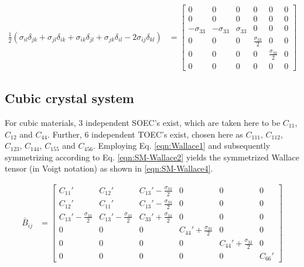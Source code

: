 \documentclass[showpacs,aps,floatfix,prb,reprint,superscriptaddress,onecolumn]{revtex4-1}
\begin{document}
\begin{enumerate}
\begin{equation}
\label{eqn:SM-Wallace3}
  \begin{aligned}
        \frac{1}{2} \left(\sigma_{il} \delta_{jk} + \sigma_{jl} \delta_{ik} + \sigma_{ik} \delta_{jl} + \sigma_{jk} \delta_{il} - 2\sigma_{ij} \delta_{kl} \right)&=\begin{bmatrix} 0 & 0 & 0 & 0 & 0 & 0 \\ 0 & 0 & 0 & 0 & 0 & 0 \\ -\sigma_{33} & -\sigma_{33} & \sigma_{33} & 0 & 0 & 0 \\ 0 & 0 & 0 & \frac{\sigma_{33}}{2} & 0 & 0 \\ 0 & 0 & 0 & 0 & \frac{\sigma_{33}}{2} & 0 \\ 0 & 0 & 0 & 0 & 0 & 0 \end{bmatrix}
       \end{aligned}
\end{equation} 

\subsection{Cubic crystal system}
For cubic materials, 3 independent SOEC's exist, which are taken here to be $C_{11}$, $C_{12}$ and $C_{44}$. Further, 6 independent TOEC's exist, chosen here as $C_{111}$, $C_{112}$, $C_{123}$, $C_{144}$, $C_{155}$ and $C_{456}$. Employing Eq. \ref{eqn:Wallace1} and subsequently symmetrizing according to Eq. \ref{eqn:SM-Wallace2} yields the symmetrized Wallace tensor (in Voigt notation) as shown in \ref{eqn:SM-Wallace4}.

\begin{equation}
\label{eqn:SM-Wallace4}
  \begin{aligned}
        \bar{B}_{ij}&=\begin{bmatrix} C_{11}' & C_{12}' & C_{13}'-\frac{\sigma_{33}}{2} & 0 & 0 & 0 \\ C_{12}' & C_{11}' & C_{13}'-\frac{\sigma_{33}}{2} & 0 & 0 & 0 \\ C_{13}'-\frac{\sigma_{33}}{2} & C_{13}'-\frac{\sigma_{33}}{2} & C_{33}'+\frac{\sigma_{33}}{2} & 0 & 0 & 0 \\ 0 & 0 & 0 & C_{44}'+\frac{\sigma_{33}}{2} & 0 & 0 \\ 0 & 0 & 0 & 0 & C_{44}'+\frac{\sigma_{33}}{2} & 0 \\ 0 & 0 & 0 & 0 & 0 & C_{66}' \end{bmatrix}
       \end{aligned}
\end{equation} 




\end{enumerate}
\end{document}
